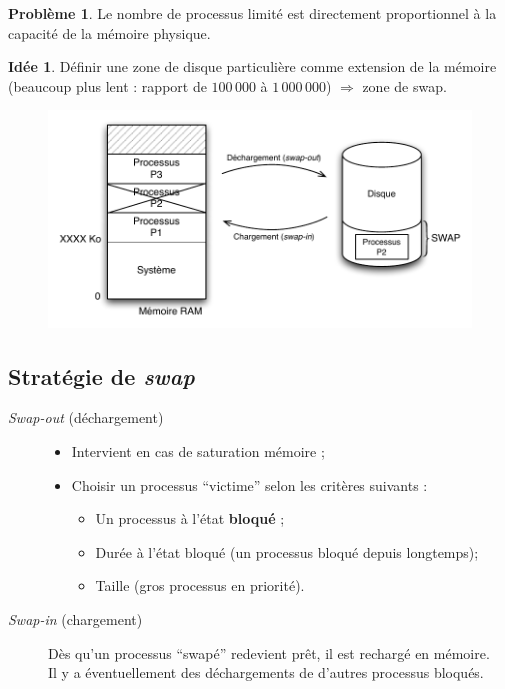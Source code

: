 \documentclass[11pt,english,french]{scrreprt}
\newcounter{cptPb}
\theoremstyle{remark}
\theoremstyle{definition}
\newtheorem*{idee*}{Idée}
\newtheorem{pb}{Problème}[cptPb]
\begin{document}
\begin{pb}
	Le nombre de processus limité est directement proportionnel à la capacité de la mémoire physique.
\end{pb}
\begin{idee*}
	 Définir une zone de disque particulière comme extension de la mémoire (beaucoup plus lent : rapport de $100\,000$ à $1\,000\,000$)  $\Rightarrow$ zone de swap.
\end{idee*}
\begin{figure}[h!]
	\center
	\vspace{-10pt}
	\includegraphics[scale=.85]{img/swap}
	\vspace{-20pt}
\end{figure}

\subsection{Stratégie de \emph{swap}}

\begin{description}
	\item [\emph{Swap-out} (déchargement)] \hfill \begin{itemize}
		\item Intervient en cas de saturation mémoire ;
		\item Choisir un processus ``victime'' selon les critères suivants :
		\begin{itemize}
			\item Un processus à l'état \textbf{bloqué} ;
			\item Durée à l'état bloqué (un processus bloqué depuis longtemps);
			\item Taille (gros processus en priorité).
		\end{itemize}
	\end{itemize}
	\item[\emph{Swap-in} (chargement)] Dès qu'un processus ``swapé'' redevient prêt, il est rechargé en mémoire.\\
	Il y a éventuellement des déchargements de d'autres processus bloqués.
\end{description}
\end{document}
